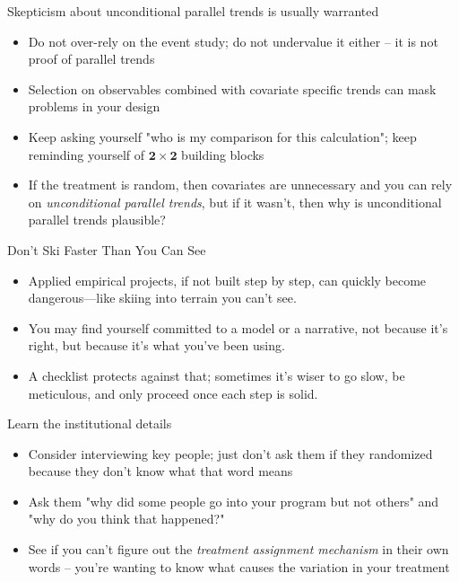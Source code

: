 \documentclass{beamer}
\begin{document}
\begin{frame}{Skepticism about unconditional parallel trends is usually warranted}

\begin{itemize}
\item Do not over-rely on the event study; do not undervalue it either -- it is not proof of parallel trends
\item Selection on observables combined with covariate specific trends can mask problems in your design
\item Keep asking yourself "who is my comparison for this calculation"; keep reminding yourself of $\mathbf{2 \times 2}$ building blocks
\item If the treatment is random, then covariates are unnecessary and you can rely on \emph{unconditional parallel trends}, but if it wasn't, then why is unconditional parallel trends plausible?
\end{itemize}

\end{frame}

\begin{frame}{Don't Ski Faster Than You Can See}

\begin{itemize}
\item Applied empirical projects, if not built step by step, can quickly become dangerous—like skiing into terrain you can’t see.
\item You may find yourself committed to a model or a narrative, not because it’s right, but because it’s what you’ve been using.
\item A checklist protects against that; sometimes it’s wiser to go slow, be meticulous, and only proceed once each step is solid.
\end{itemize}

\end{frame}

\begin{frame}{Learn the institutional details}

\begin{itemize}
\item Consider interviewing key people; just don't ask them if they randomized because they don't know what that word means
\item Ask them "why did some people go into your program but not others" and "why do you think that happened?"
\item See if you can't figure out the \emph{treatment assignment mechanism} in their own words -- you're wanting to know what causes the variation in your treatment
\end{itemize}

\end{frame}
\end{document}

